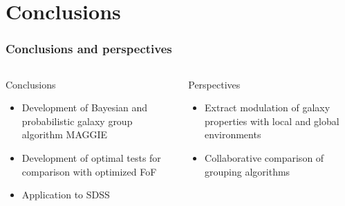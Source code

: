 \section{Conclusions}

\begin{frame}
    \frametitle{Conclusions and perspectives}
    \begin{columns}
        \begin{column}{0.5\textwidth}
            \begin{block}{Conclusions}
                \begin{itemize}
                    \item<1-> Development of Bayesian and probabilistic galaxy
                        group algorithm MAGGIE
                    \item<2-> Development of optimal tests for comparison
                        with optimized FoF
                    \item<3-> Application to SDSS
                \end{itemize}
            \end{block}
        \end{column}
        \begin{column}{0.5\textwidth}
            \begin{block}{Perspectives}
                \begin{itemize}
                    \item<4-> Extract modulation of galaxy properties with
                        local and global environments
                    \item<5-> Collaborative comparison of grouping algorithms
                \end{itemize}
            \end{block}
        \end{column}
    \end{columns}
\end{frame}
